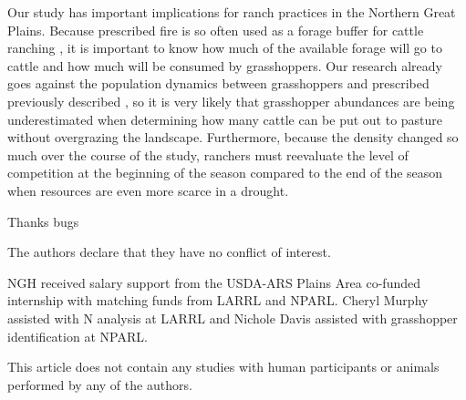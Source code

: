 \documentclass[referee, 
	            sn-basic]
           {sn-jnl}
\begin{document}
\begin{linenumbers}
Our study has important implications for ranch practices in the Northern
Great Plains. Because prescribed fire is so often used as a forage
buffer for cattle ranching \citep{spiess2020}, it is important to know
how much of the available forage will go to cattle and how much will be
consumed by grasshoppers. Our research already goes against the
population dynamics between grasshoppers and prescribed previously
described \citep{joern2004, vermeire2004}, so it is very likely that
grasshopper abundances are being underestimated when determining how
many cattle can be put out to pasture without overgrazing the landscape.
Furthermore, because the density changed so much over the course of the
study, ranchers must reevaluate the level of competition at the
beginning of the season compared to the end of the season when resources
are even more scarce in a drought.

\backmatter



Thanks bugs


The authors declare that they have no conflict of interest.


NGH received salary support from the USDA-ARS Plains Area co-funded internship with matching funds from LARRL and NPARL. 
Cheryl Murphy assisted with N analysis at LARRL and Nichole Davis assisted with grasshopper identification at NPARL. 


This article does not contain any studies with human participants or animals performed by any of the authors. 
 



\end{linenumbers}
\end{document}

